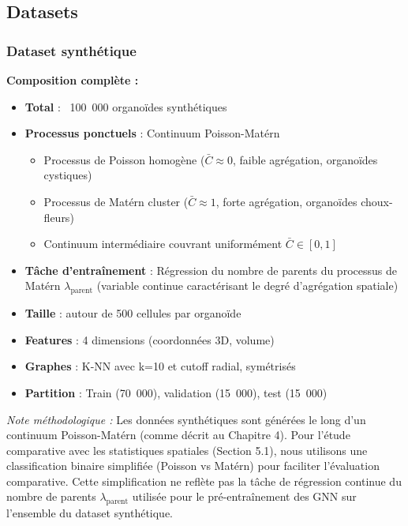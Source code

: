 \subsection{Datasets}

\subsubsection{Dataset synthétique}

\textbf{Composition complète :}
\begin{itemize}
    \item \textbf{Total} : ~100~000 organoïdes synthétiques
    \item \textbf{Processus ponctuels} : Continuum Poisson-Matérn
    \begin{itemize}
        \item Processus de Poisson homogène ($\bar{C} \approx 0$, faible agrégation, organoïdes cystiques)
        \item Processus de Matérn cluster ($\bar{C} \approx 1$, forte agrégation, organoïdes choux-fleurs)
        \item Continuum intermédiaire couvrant uniformément $\bar{C} \in [0, 1]$
    \end{itemize}
    \item \textbf{Tâche d'entraînement} : Régression du nombre de parents du processus de Matérn $\lambda_{\text{parent}}$ (variable continue caractérisant le degré d'agrégation spatiale)
    \item \textbf{Taille} : autour de 500 cellules par organoïde
    \item \textbf{Features} : 4 dimensions (coordonnées 3D, volume)
    \item \textbf{Graphes} : K-NN avec k=10 et cutoff radial, symétrisés
    \item \textbf{Partition} : Train (70~000), validation (15~000), test (15~000)
\end{itemize}

\textit{Note méthodologique :} Les données synthétiques sont générées le long d'un continuum Poisson-Matérn (comme décrit au Chapitre 4). Pour l'étude comparative avec les statistiques spatiales (Section 5.1), nous utilisons une classification binaire simplifiée (Poisson vs Matérn) pour faciliter l'évaluation comparative. Cette simplification ne reflète pas la tâche de régression continue du nombre de parents $\lambda_{\text{parent}}$ utilisée pour le pré-entraînement des GNN sur l'ensemble du dataset synthétique.

